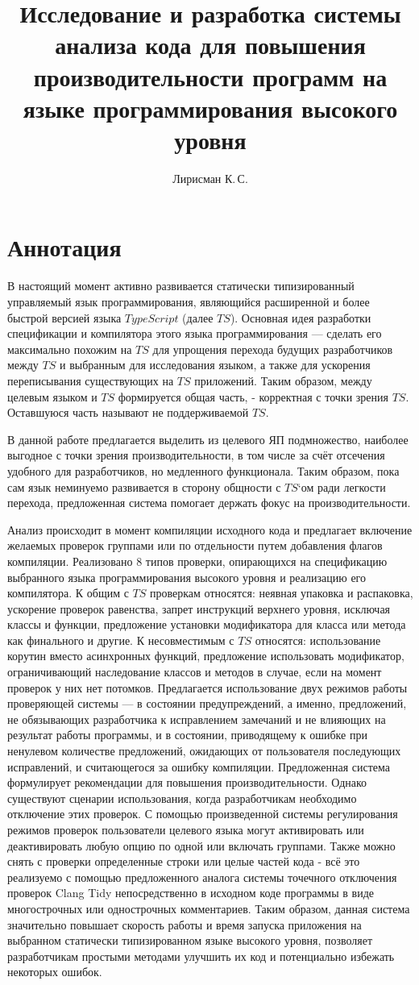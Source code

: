 \documentclass{mipt-thesis-bs}
\title{Исследование и разработка системы анализа кода для повышения производительности программ на языке программирования высокого уровня}
\author{Лирисман К.\,С.}
\begin{document}
\titlecontents
\chapter{Аннотация}

В настоящий момент активно развивается статически типизированный управляемый язык
программирования, являющийся расширенной и более быстрой версией языка $TypeScript$ (далее $TS$).
Основная идея разработки спецификации и компилятора этого языка программирования — сделать его максимально
похожим на $TS$ для упрощения перехода будущих разработчиков между $TS$ и
выбранным для исследования языком, а также для ускорения переписывания существующих на $TS$ приложений.
Таким образом, между целевым языком и $TS$ формируется общая часть, - корректная с точки зрения $TS$.
Оставшуюся часть называют не поддерживаемой $TS$.

В данной работе предлагается выделить из целевого ЯП подмножество, наиболее выгодное с точки зрения производительности,
в том числе за счёт отсечения удобного для разработчиков, но медленного функционала. Таким образом, пока сам язык неминуемо
развивается в сторону общности с $TS$`ом ради легкости перехода, предложенная система помогает держать фокус
на производительности.

Анализ происходит в момент компиляции исходного кода и предлагает включение желаемых
проверок группами или по отдельности путем добавления флагов компиляции. Реализовано
8 типов проверки, опирающихся на спецификацию выбранного языка
программирования высокого уровня и реализацию его компилятора. К общим с $TS$ проверкам относятся:
неявная упаковка и распаковка, ускорение проверок равенства, запрет инструкций верхнего уровня, исключая
классы и функции, предложение установки модификатора для класса или метода как
финального и другие. К несовместимым с $TS$ относятся: использование корутин вместо асинхронных функций,
предложение использовать модификатор, ограничивающий наследование классов и методов в случае, если на
момент проверок у них нет потомков.
Предлагается использование двух режимов работы проверяющей системы — в состоянии
предупреждений, а именно, предложений, не обязывающих разработчика к исправлением замечаний и не
влияющих на результат работы программы, и в состоянии, приводящему к ошибке при ненулевом количестве
предложений, ожидающих от пользователя последующих исправлений, и считающегося за
ошибку компиляции.
Предложенная система формулирует рекомендации для повышения производительности. Однако
существуют сценарии использования, когда разработчикам необходимо отключение этих проверок.
С помощью произведенной системы регулирования режимов проверок пользователи целевого языка
могут активировать или деактивировать любую опцию по одной или включать группами.
Также можно снять с проверки определенные строки или целые частей кода - всё это реализуемо с помощью
предложенного аналога системы точечного отключения проверок Clang Tidy непосредственно
в исходном коде программы в виде многострочных или однострочных комментариев.
Таким образом, данная система значительно повышает скорость работы и время запуска
приложения на выбранном статически типизированном языке высокого уровня, позволяет разработчикам
простыми методами улучшить их код и потенциально избежать некоторых ошибок.
\end{document}
